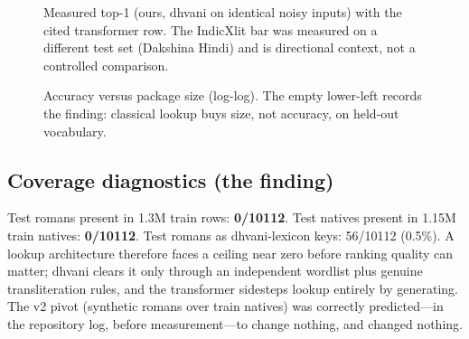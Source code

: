 \documentclass[11pt,a4paper]{article}
\begin{document}
\begin{figure}[H]
\centering
{}
\caption{Measured top-1 (ours, dhvani on identical noisy inputs) with the cited transformer row. The IndicXlit bar was measured on a different test set (Dakshina Hindi) and is directional context, not a controlled comparison.}
\label{fig:acc}
\end{figure}

\begin{figure}[H]
\centering
{}
\caption{Accuracy versus package size (log-log). The empty lower-left records the finding: classical lookup buys size, not accuracy, on held-out vocabulary.}
\label{fig:tradeoff}
\end{figure}

\subsection{Coverage diagnostics (the finding)}

Test romans present in 1.3M train rows: \textbf{0/10112}. Test natives present in 1.15M train natives: \textbf{0/10112}. Test romans as dhvani-lexicon keys: 56/10112 (0.5\%). A lookup architecture therefore faces a ceiling near zero before ranking quality can matter; dhvani clears it only through an independent wordlist plus genuine transliteration rules, and the transformer sidesteps lookup entirely by generating. The v2 pivot (synthetic romans over train natives) was correctly predicted---in the repository log, before measurement---to change nothing, and changed nothing.
\end{document}
